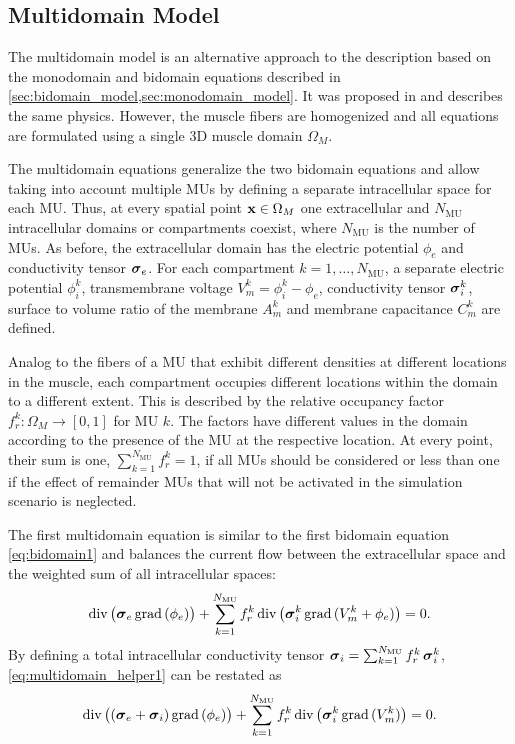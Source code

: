 \subsection{Multidomain Model}\label{sec:multidomain_model}

The multidomain model is an alternative approach to the description based on the monodomain and bidomain equations described in \cref{sec:bidomain_model,sec:monodomain_model}. It was proposed in \cite{Klotz2020} and describes the same physics. However, the muscle fibers are homogenized and all equations are formulated using a single 3D muscle domain $\Omega_M$.

The multidomain equations generalize the two bidomain equations and allow taking into account multiple MUs by defining a separate intracellular space for each MU. Thus, at every spatial point $\textbf{x} \in \Omega_M$ one extracellular and  $N_\text{MU}$ intracellular domains or compartments coexist, where $N_\text{MU}$ is the number of MUs. As before, the extracellular domain has the electric potential $\phi_e$ and  conductivity tensor $\boldsymbol{\sigma}_e$. For each compartment $k = 1, \dots, N_\text{MU}$, a separate electric potential $\phi_i^k$, transmembrane voltage $V_m^k = \phi_i^k-\phi_e$, conductivity tensor $\boldsymbol{\sigma}_i^k$, surface to volume ratio of the membrane $A_m^k$ and membrane capacitance $C_m^k$ are defined.

Analog to the fibers of a MU that exhibit different densities at different locations in the muscle, each compartment occupies different locations within the domain to a different extent. This is described by the relative occupancy factor $f_r^k: \Omega_M \to [0,1]$ for MU $k$. The factors have different values in the domain according to the presence of the MU at the respective location. At every point, their sum is one, $\sum_{k=1}^{N_\text{MU}} f_r^k = 1$, if all MUs should be considered or less than one if the effect of remainder MUs that will not be activated in the simulation scenario is neglected.

The first multidomain equation is similar to the first bidomain equation \cref{eq:bidomain1} and balances the current flow between the extracellular space and the weighted sum of all intracellular spaces:%
\begin{align}\label{eq:multidomain_helper1}
  \hbox{div} \,\big(\boldsymbol{\sigma}_e\,\hbox{grad} \,(\phi_e)\big)  + \displaystyle\sum\limits_{k=1}^{N_\text{MU}} f_r^k\,\hbox{div} \,\big(\boldsymbol{\sigma}_i^k\,\hbox{grad} \,(V_m^k + \phi_e)\big) = 0.
\end{align}
By defining a total intracellular conductivity tensor $\boldsymbol{\sigma}_i = \sum_{k=1}^{N_\text{MU}}f_r^k\,\boldsymbol{\sigma}_i^k$, \cref{eq:multidomain_helper1} can be restated as
%
\begin{align}\label{eq:multidomain1}
  \hbox{div} \,\big((\boldsymbol{\sigma}_e + \boldsymbol{\sigma}_i)\,\hbox{grad} \,(\phi_e)\big) + \sum\limits_{k=1}^{N_\text{MU}} f_r^k\,\hbox{div} \,\big(\boldsymbol{\sigma}_i^k\,\hbox{grad} \,(V_m^k)\big) = 0.
\end{align}

